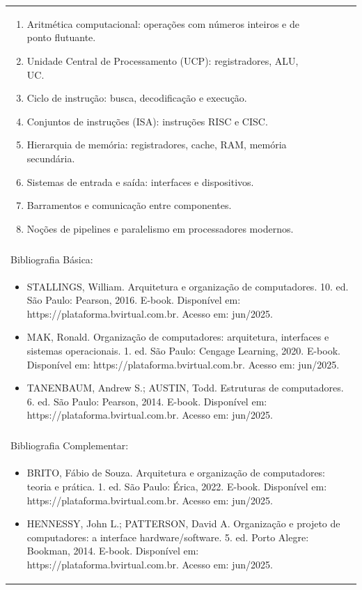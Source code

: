 \documentclass[11pt]{article}
\begin{document}
\begin{center}
\begin{longtable}{|p{4cm}|p{4cm}|p{4cm}|p{4cm}|}
{\begin{enumerate}
\item Aritmética computacional: operações com números inteiros e de ponto flutuante.
\item Unidade Central de Processamento (UCP): registradores, ALU, UC.
\item Ciclo de instrução: busca, decodificação e execução.
\item Conjuntos de instruções (ISA): instruções RISC e CISC.
\item Hierarquia de memória: registradores, cache, RAM, memória secundária.
\item Sistemas de entrada e saída: interfaces e dispositivos.
\item Barramentos e comunicação entre componentes.
\item Noções de pipelines e paralelismo em processadores modernos.\end{enumerate}}\\
\multicolumn{4}{|p{16cm}|}{}\\
\hline
\multicolumn{4}{|p{16cm}|}{Bibliografia Básica:}\\
\multicolumn{4}{|p{16cm}|}{%
\begin{itemize}\item STALLINGS, William. Arquitetura e organização de computadores. 10. ed. São Paulo: Pearson, 2016. E-book. Disponível em: https://plataforma.bvirtual.com.br. Acesso em: jun/2025.
\item MAK, Ronald. Organização de computadores: arquitetura, interfaces e sistemas operacionais. 1. ed. São Paulo: Cengage Learning, 2020. E-book. Disponível em: https://plataforma.bvirtual.com.br. Acesso em: jun/2025.
\item TANENBAUM, Andrew S.; AUSTIN, Todd. Estruturas de computadores. 6. ed. São Paulo: Pearson, 2014. E-book. Disponível em: https://plataforma.bvirtual.com.br. Acesso em: jun/2025.\end{itemize}}\\
\multicolumn{4}{|p{16cm}|}{}\\
\hline
\multicolumn{4}{|p{16cm}|}{Bibliografia Complementar:}\\
\multicolumn{4}{|p{16cm}|}{%
\begin{itemize}\item BRITO, Fábio de Souza. Arquitetura e organização de computadores: teoria e prática. 1. ed. São Paulo: Érica, 2022. E-book. Disponível em: https://plataforma.bvirtual.com.br. Acesso em: jun/2025.
\item HENNESSY, John L.; PATTERSON, David A. Organização e projeto de computadores: a interface hardware/software. 5. ed. Porto Alegre: Bookman, 2014. E-book. Disponível em: https://plataforma.bvirtual.com.br. Acesso em: jun/2025.

\end{itemize}}
\end{longtable}
\end{center}
\end{document}
